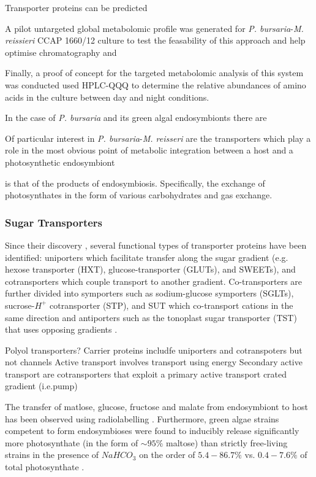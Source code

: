 {{Transporter proteins can be predicted 






A pilot untargeted global metabolomic profile was generated
for \textit{P. bursaria}-\textit{M. reissieri} CCAP 1660/12 
culture to test the feasability of this approach and help optimise
chromatography and 


Finally, a proof of concept for the targeted metabolomic
analysis of this system was conducted used HPLC-QQQ
to determine the relative abundances of amino acids
in the culture between day and night conditions. 



In the case of \textit{P. bursaria} and its green algal endosymbionts 
there are



Of particular interest in \textit{P. bursaria}-\textit{M. reisseri} 
are the transporters which play a role in the most obvious point of 
metabolic integration between a host
and a photosynthetic endosymbiont 


is that of the products of endosymbiosis. 
Specifically, the exchange of photosynthates in the form of various
carbohydrates and gas exchange. 

\subsubsection{Sugar Transporters}

Since their discovery \citep{Cohen1957}, several functional types of transporter proteins have been identified:
uniporters which facilitate transfer along the sugar gradient (e.g. hexose
transporter (HXT), glucose-transporter (GLUTs), and SWEETs),
and cotransporters which couple transport to another gradient. 
Co-transporters are further divided into symporters such as sodium-glucose symporters (SGLTs), sucrose-\(H^{+}\) 
cotransporter (STP), and SUT which co-transport cations in the same direction and
antiporters such as the tonoplast sugar transporter (TST) that uses opposing
gradients \citep{Chen2015}.


Polyol transporters?
Carrier proteins includfe uniporters and cotranspoters but not channels
Active transport involves transport using energy
Secondary active transport are cotransporters that exploit a primary active transport crated
gradient (i.e.pump)



The transfer of matlose, glucose, fructose and malate from endosymbiont
to host has been observed using radiolabelling 
\citep{Brown1974}.  Furthermore, green algae strains competent to
 form endosymbioses were found to inducibly release significantly
 more photosynthate (in the form of \(\sim 95\%\) maltose) than strictly free-living strains
 in the presence of \(NaHCO_3\) on the order of \(5.4-86.7\%\) vs. \(0.4-7.6\%\)
 of total photosynthate \citep{Muscatine1967a}.

}}
